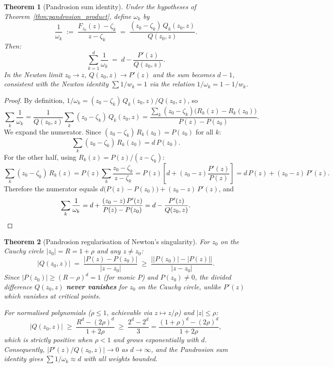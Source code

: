 \documentclass[10pt,a4paper,oneside]{book}
\newtheorem{theorem}{Theorem}[chapter]
\theoremstyle{definition}
\theoremstyle{remark}
\begin{document}
\begin{theorem}[Pandrosion sum identity]
\label{thm:pandrosion_sum}
Under the hypotheses of Theorem~\ref{thm:pandrosion_product}, define $\omega_k$ by
\[
  \frac{1}{\omega_k} \;:=\; \frac{F_{z_0}(z) - \zeta_k}{z - \zeta_k}
  \;=\; \frac{(z_0 - \zeta_k)\,Q_k(z_0,z)}{Q(z_0,z)}.
\]
Then:
\begin{equation}
  \label{eq:pandrosion_sum}
  \sum_{k=1}^d \frac{1}{\omega_k}
  \;=\; d - \frac{P'(z)}{Q(z_0,z)}.
\end{equation}
In the Newton limit $z_0 \to z$, $Q(z_0,z) \to P'(z)$ and the sum becomes $d - 1$, consistent with the Newton identity $\sum 1/w_k = 1$ via the relation $1/\omega_k = 1 - 1/w_k$.
\end{theorem}

\begin{proof}
By definition, $1/\omega_k = (z_0-\zeta_k)\,Q_k(z_0,z)/Q(z_0,z)$, so
\[
  \sum_k \frac{1}{\omega_k}
  = \frac{1}{Q(z_0,z)} \sum_k (z_0-\zeta_k)\,Q_k(z_0,z)
  = \frac{\sum_k (z_0-\zeta_k)\bigl(R_k(z)-R_k(z_0)\bigr)}{P(z)-P(z_0)}.
\]
We expand the numerator.  Since $(z_0-\zeta_k)\,R_k(z_0) = P(z_0)$ for all $k$:
\[
  \sum_k (z_0-\zeta_k)\,R_k(z_0) = d\,P(z_0).
\]
For the other half, using $R_k(z) = P(z)/(z-\zeta_k)$:
\[
  \sum_k (z_0-\zeta_k)\,R_k(z) = P(z)\sum_k \frac{z_0-\zeta_k}{z-\zeta_k}
  = P(z)\left[d + (z_0-z)\frac{P'(z)}{P(z)}\right]
  = d\,P(z) + (z_0-z)\,P'(z).
\]
Therefore the numerator equals $d\bigl(P(z)-P(z_0)\bigr) + (z_0-z)\,P'(z)$, and
\[
  \sum_k \frac{1}{\omega_k}
  = d + \frac{(z_0-z)\,P'(z)}{P(z)-P(z_0)}
  = d - \frac{P'(z)}{Q(z_0,z)}.
  \qedhere
\]
\end{proof}

\begin{theorem}[Pandrosion regularisation of Newton's singularity]
\label{thm:pandrosion_regularisation}
For $z_0$ on the Cauchy circle $|z_0| = R = 1 + \rho$ and any $z \neq z_0$:
\[
  |Q(z_0, z)| \;=\; \frac{|P(z) - P(z_0)|}{|z - z_0|}
  \;\geq\; \frac{\bigl||P(z_0)| - |P(z)|\bigr|}{|z - z_0|}.
\]
Since $|P(z_0)| \geq (R-\rho)^d = 1$ (for monic $P$) and $P(z_0) \neq 0$, the divided difference $Q(z_0,z)$ \textbf{never vanishes} for $z_0$ on the Cauchy circle, unlike $P'(z)$ which vanishes at critical points.

For \emph{normalised} polynomials ($\rho \leq 1$, achievable via $z \mapsto z/\rho$) and $|z| \leq \rho$:
\[
  |Q(z_0, z)| \;\geq\; \frac{R^d - (2\rho)^d}{1+2\rho} \;\geq\; \frac{2^d - 2^d}{3} = \frac{(1+\rho)^d - (2\rho)^d}{1+2\rho},
\]
which is strictly positive when $\rho < 1$ and grows exponentially with $d$.  Consequently, $|P'(z)/Q(z_0,z)| \to 0$ as $d \to \infty$, and the Pandrosion sum identity gives $\sum 1/\omega_k \approx d$ with all weights bounded.
\end{theorem}
\end{document}
